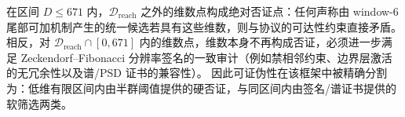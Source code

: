 \begin{proposition}\label{prop:xi-window6-falsifiability-layering-from-semigroup}
在区间 \(D\le 671\) 内，\(\mathcal D_{\mathrm{reach}}\) 之外的维数点构成绝对否证点：任何声称由 window-\(6\) 尾部可加机制产生的统一候选若具有这些维数，则与协议的可达性约束直接矛盾。
相反，对 \(\mathcal D_{\mathrm{reach}}\cap[0,671]\) 内的维数点，维数本身不再构成否证，必须进一步满足 Zeckendorf--Fibonacci 分辨率签名的一致审计（例如禁相邻约束、边界层激活的无冗余性以及谱/PSD 证书的兼容性）。
因此可证伪性在该框架中被精确分割为：低维有限区间内由半群阈值提供的硬否证，与同区间内由签名/谱证书提供的软筛选两类。
\end{proposition}

